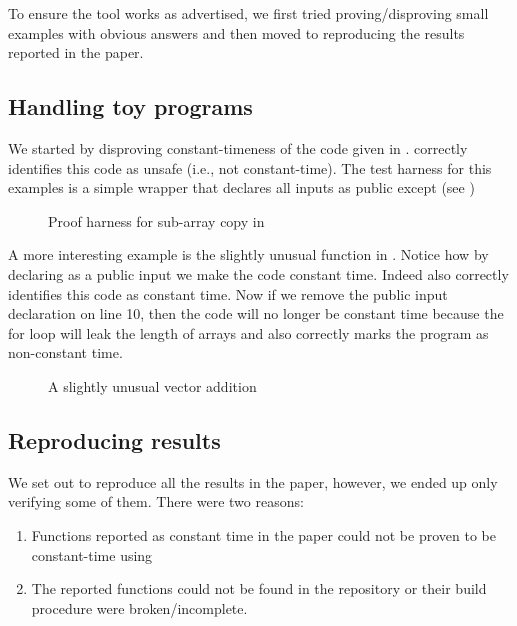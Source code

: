 To ensure the tool works as advertised, we first tried proving/disproving
small examples with obvious answers and then moved to reproducing the
results reported in the paper\cite{almeida}.


\subsection{Handling toy programs}

We started by disproving constant-timeness of the code given in .
\ctVerif correctly identifies this code as unsafe (i.e., not constant-time).
The test harness for this examples is a simple wrapper that declares all inputs
as public except  (see )

\begin{figure}[h]
    \centering\resizebox{0.7\columnwidth}{!}{}
    \caption{Proof harness for sub-array copy in }
    \label{fig:example_wrapper}
\end{figure}

A more interesting example is the slightly unusual 
function in . Notice how by declaring  as
a public input we make the code constant time. Indeed \ctVerif  also correctly
identifies this code as constant time. Now if we remove the public input
declaration on line 10, then the code will no longer be constant time because the
for loop will leak the length of arrays and \ctVerif also correctly marks the
program as non-constant time.

\begin{figure}[h]
    \centering\resizebox{0.7\columnwidth}{!}{}
    \caption{A slightly unusual vector addition}
    \label{fig:vector_add}
\end{figure}


\subsection{Reproducing results}


We set out to reproduce all the results in the paper, however, we ended up
only verifying some of them. There were two reasons:
\begin{enumerate}
    \item Functions reported as constant time in the paper could not be proven
    to be constant-time using
    \item The reported functions could not be found in the \ctVerif repository
    or their build procedure were broken/incomplete.
\end{enumerate}

